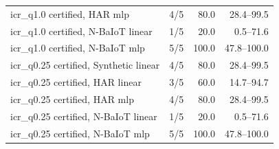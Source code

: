 \begin{table}[h]
\begin{tabular}{@{}lrrr@{}}
icr\_q1.0 certified, HAR mlp & 4/5 & 80.0 & 28.4--99.5 \\
icr\_q1.0 certified, N-BaIoT linear & 1/5 & 20.0 & 0.5--71.6 \\
icr\_q1.0 certified, N-BaIoT mlp & 5/5 & 100.0 & 47.8--100.0 \\
icr\_q0.25 certified, Synthetic linear & 4/5 & 80.0 & 28.4--99.5 \\
icr\_q0.25 certified, HAR linear & 3/5 & 60.0 & 14.7--94.7 \\
icr\_q0.25 certified, HAR mlp & 4/5 & 80.0 & 28.4--99.5 \\
icr\_q0.25 certified, N-BaIoT linear & 1/5 & 20.0 & 0.5--71.6 \\
icr\_q0.25 certified, N-BaIoT mlp & 5/5 & 100.0 & 47.8--100.0 \\
\bottomrule
\end{tabular}
\end{table}
